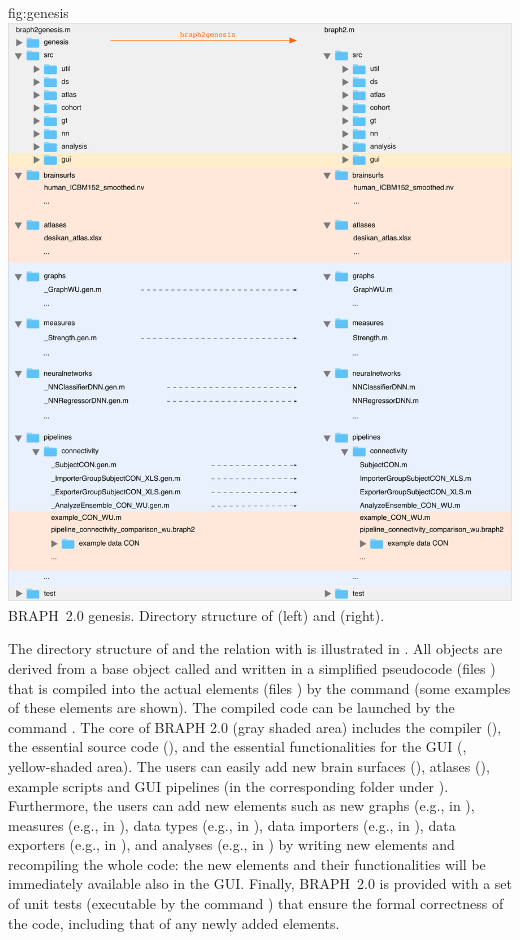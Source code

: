 \documentclass{tufte-handout}
\begin{document}
	{fig:genesis}
	{\includegraphics{../braph2genesis.png}}
	{BRAPH~2.0 genesis.}
	{
	Directory structure of  (left) and  (right).
	}

The directory structure of  and the relation with  is illustrated in .
All objects are derived from a base object called  and written in a simplified pseudocode (files ) that is compiled into the actual elements (files ) by the command  (some examples of these elements are shown).
The compiled code can be launched by the command .
The core of BRAPH 2.0 (gray shaded area) includes the compiler (), the essential source code (), and the essential functionalities for the GUI (, yellow-shaded area).
The users can easily add new brain surfaces (), atlases (), example scripts and GUI pipelines (in the corresponding folder under ).
Furthermore, the users can add new elements such as new graphs (e.g.,  in ), measures (e.g.,  in ), data types (e.g.,  in ), data importers (e.g.,  in ), data exporters (e.g.,  in ), and analyses (e.g.,  in ) by writing new elements and recompiling the whole code: the new elements and their functionalities will be immediately available also in the GUI.
Finally, BRAPH~2.0 is provided with a set of unit tests (executable by the command ) that ensure the formal correctness of the code, including that of any newly added elements.
\end{document}
